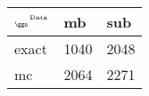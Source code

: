 \begin{tabular}{lll}
    \toprule
    $_{\text{\tiny{\ggn}}}$$^{\text{\tiny{Data}}}$ & mb & sub \\
    \midrule
    exact & 1040
              & 2048 \\
    mc   & 2064
              & 2271 \\
    \bottomrule
\end{tabular}